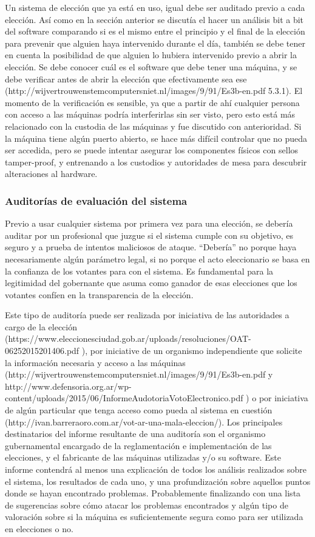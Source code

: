 Un sistema de elección que ya está en uso, igual debe ser auditado previo a cada elección. Así como en la sección anterior se discutía el hacer un análisis bit a bit del software comparando si es el mismo entre el principio y el final de la elección para prevenir que alguien haya intervenido durante el día, también se debe tener en cuenta la posibilidad de que alguien lo hubiera intervenido previo a abrir la elección. Se debe conocer cuál es el software que debe tener una máquina, y se debe verificar antes de abrir la elección que efectivamente sea ese (http://wijvertrouwenstemcomputersniet.nl/images/9/91/Es3b-en.pdf 5.3.1).
El momento de la verificación es sensible, ya que a partir de ahí cualquier persona con acceso a las máquinas podría interferirlas sin ser visto, pero esto está más relacionado con la custodia de las máquinas y fue discutido con anterioridad. Si la máquina tiene algún puerto abierto, se hace más difícil controlar que no pueda ser accedida, pero se puede intentar asegurar los componentes físicos con sellos tamper-proof, y entrenando a los custodios y autoridades de mesa para descubrir alteraciones al hardware.

\subsubsection{Auditorías de evaluación del sistema}

Previo a usar cualquier sistema por primera vez para una elección, se debería auditar por un profesional que juzgue si el sistema cumple con su objetivo, es seguro y a prueba de intentos maliciosos de ataque. “Debería” no porque haya necesariamente algún parámetro legal, si no porque el acto eleccionario se basa en la confianza de los votantes para con el sistema. Es fundamental para la legitimidad del gobernante que asuma como ganador de esas elecciones que los votantes confíen en la transparencia de la elección.

Este tipo de auditoría puede ser realizada por iniciativa de las autoridades a cargo de la elección (https://www.eleccionesciudad.gob.ar/uploads/resoluciones/OAT-06252015201406.pdf ), por iniciative de un organismo independiente que solicite la información necesaria y acceso a las máquinas (http://wijvertrouwenstemcomputersniet.nl/images/9/91/Es3b-en.pdf y http://www.defensoria.org.ar/wp-content/uploads/2015/06/InformeAudotoriaVotoElectronico.pdf ) o por iniciativa de algún particular que tenga acceso como pueda al sistema en cuestión (http://ivan.barreraoro.com.ar/vot-ar-una-mala-eleccion/).
Los principales destinatarios del informe resultante de una auditoría son el organismo gubernamental encargado de la reglamentación e implementación de las elecciones, y el fabricante de las máquinas utilizadas y/o su software. Este informe contendrá al menos una explicación de todos los análisis realizados sobre el sistema, los resultados de cada uno, y una profundización sobre aquellos puntos donde se hayan encontrado problemas. Probablemente finalizando con una lista de sugerencias sobre cómo atacar los problemas encontrados y algún tipo de valoración sobre si la máquina es suficientemente segura como para ser utilizada en elecciones o no.

